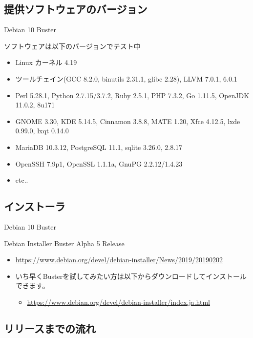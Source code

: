 \subsection{提供ソフトウェアのバージョン}


\begin{frame}{Debian 10 Buster}%

ソフトウェアは以下のバージョンでテスト中

\begin{itemize}
\item Linux カーネル 4.19
\item ツールチェイン(GCC 8.2.0, binutils 2.31.1, glibc 2.28), LLVM 7.0.1, 6.0.1
\item Perl 5.28.1, Python 2.7.15/3.7.2, Ruby 2.5.1, PHP 7.3.2, Go 1.11.5, OpenJDK 11.0.2, 8u171
\item GNOME 3.30, KDE 5.14.5, Cinnamon 3.8.8, MATE 1.20, Xfce 4.12.5, lxde 0.99.0, lxqt 0.14.0
\item MariaDB 10.3.12, PostgreSQL 11.1, sqlite 3.26.0, 2.8.17 
\item OpenSSH 7.9p1, OpenSSL 1.1.1a, GnuPG 2.2.12/1.4.23
\item etc..
\end{itemize}

\end{frame}


\subsection{インストーラ}


\begin{frame}{Debian 10 Buster}%

Debian Installer Buster Alpha 5 Release

\begin{itemize}
  \item \url{https://www.debian.org/devel/debian-installer/News/2019/20190202}
  \item いち早くBusterを試してみたい方は以下からダウンロードしてインストールできます。
  \begin{itemize}
    \item \url{https://www.debian.org/devel/debian-installer/index.ja.html}
  \end{itemize}
\end{itemize}

\end{frame}


\subsection{リリースまでの流れ}

